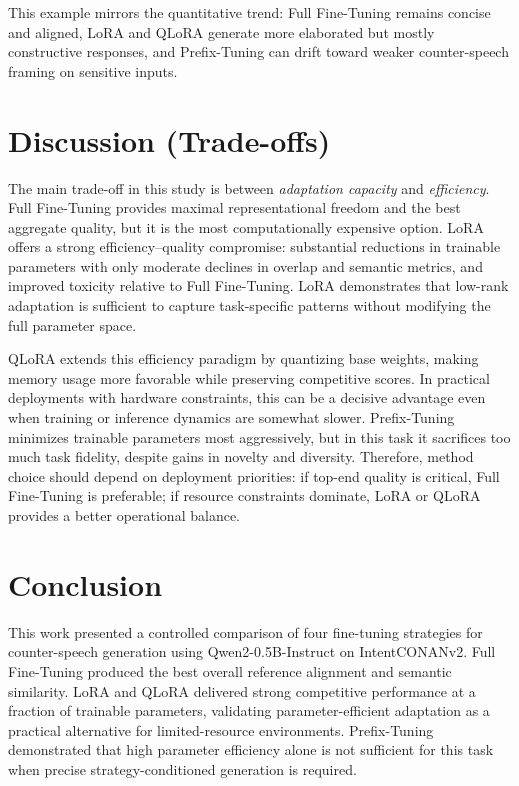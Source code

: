 \documentclass[11pt]{article}
\begin{document}
This example mirrors the quantitative trend: Full Fine-Tuning remains concise and aligned, LoRA and QLoRA generate more elaborated but mostly constructive responses, and Prefix-Tuning can drift toward weaker counter-speech framing on sensitive inputs.

\section{Discussion (Trade-offs)}
The main trade-off in this study is between \emph{adaptation capacity} and \emph{efficiency}. Full Fine-Tuning provides maximal representational freedom and the best aggregate quality, but it is the most computationally expensive option. LoRA offers a strong efficiency--quality compromise: substantial reductions in trainable parameters with only moderate declines in overlap and semantic metrics, and improved toxicity relative to Full Fine-Tuning. LoRA demonstrates that low-rank adaptation is sufficient to capture task-specific patterns without modifying the full parameter space.

QLoRA extends this efficiency paradigm by quantizing base weights, making memory usage more favorable while preserving competitive scores. In practical deployments with hardware constraints, this can be a decisive advantage even when training or inference dynamics are somewhat slower. Prefix-Tuning minimizes trainable parameters most aggressively, but in this task it sacrifices too much task fidelity, despite gains in novelty and diversity. Therefore, method choice should depend on deployment priorities: if top-end quality is critical, Full Fine-Tuning is preferable; if resource constraints dominate, LoRA or QLoRA provides a better operational balance.

\section{Conclusion}
This work presented a controlled comparison of four fine-tuning strategies for counter-speech generation using Qwen2-0.5B-Instruct on IntentCONANv2. Full Fine-Tuning produced the best overall reference alignment and semantic similarity. LoRA and QLoRA delivered strong competitive performance at a fraction of trainable parameters, validating parameter-efficient adaptation as a practical alternative for limited-resource environments. Prefix-Tuning demonstrated that high parameter efficiency alone is not sufficient for this task when precise strategy-conditioned generation is required.
\end{document}
